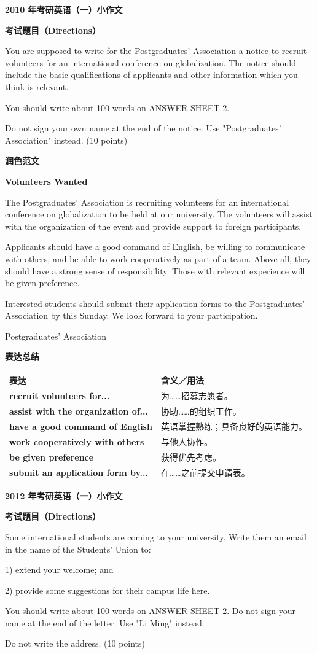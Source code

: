 \documentclass[a4paper,12pt]{article}
\newcommand{\pageheading}[1]{%
  \begin{center}
    {\fontsize{16pt}{20pt}\selectfont\bfseries\color{navy}#1}
  \end{center}
  \vspace{2mm}
}
\newcommand{\sectionlabel}[1]{%
  \vspace{1.5mm}
  {\fontsize{11pt}{14pt}\selectfont\bfseries\color{navy}#1\par}
  \vspace{1mm}
}
\newenvironment{promptbox}{%
  \begin{tcolorbox}[colback=lightgray,colframe=rulegray,boxrule=.35pt,arc=.5mm,
  left=2.2mm,right=2.2mm,top=1.4mm,bottom=1.4mm,before skip=0pt,after skip=1mm]
  \fontsize{11pt}{13.4pt}\selectfont
  \RaggedRight
}{%
  \end{tcolorbox}
}
\newenvironment{essaybody}{%
  \fontsize{14pt}{20pt}\selectfont
  \RaggedRight
  \setlength{\parskip}{5pt}
}{\par}
\newcommand{\expressions}[1]{%
  \sectionlabel{表达总结}
  {\fontsize{10.8pt}{13.2pt}\selectfont
  \begin{tabularx}{\textwidth}{>{\RaggedRight\arraybackslash}p{0.46\textwidth} >{\RaggedRight\arraybackslash}X}
  \toprule
  \textbf{表达} & \textbf{含义／用法}\\
  \midrule
  #1
  \bottomrule
  \end{tabularx}}
}
\newcommand{\exprow}[2]{\textbf{#1} & #2\\}
\newcommand{\noticeissuer}[1]{%
  \par\vspace{2mm}\begin{flushright}\fontsize{14pt}{20pt}\selectfont #1\end{flushright}
}
\begin{document}
\thispagestyle{fancy}
\pageheading{2010 年考研英语（一）小作文}
\sectionlabel{考试题目（Directions）}
\begin{promptbox}
You are supposed to write for the Postgraduates' Association a notice to recruit volunteers for an international conference on globalization. The notice should include the basic qualifications of applicants and other information which you think is relevant.

You should write about 100 words on ANSWER SHEET 2.

Do not sign your own name at the end of the notice. Use "Postgraduates' Association" instead. (10 points)
\end{promptbox}

\sectionlabel{润色范文}
\begin{essaybody}
\begin{center}
\textbf{Volunteers Wanted}
\end{center}
The Postgraduates' Association is recruiting volunteers for an international conference on globalization to be held at our university. The volunteers will assist with the organization of the event and provide support to foreign participants.

Applicants should have a good command of English, be willing to communicate with others, and be able to work cooperatively as part of a team. Above all, they should have a strong sense of responsibility. Those with relevant experience will be given preference.

Interested students should submit their application forms to the Postgraduates' Association by this Sunday. We look forward to your participation.
\noticeissuer{Postgraduates' Association}
\end{essaybody}

\expressions{
\exprow{recruit volunteers for...}{为……招募志愿者。}
\exprow{assist with the organization of...}{协助……的组织工作。}
\exprow{have a good command of English}{英语掌握熟练；具备良好的英语能力。}
\exprow{work cooperatively with others}{与他人协作。}
\exprow{be given preference}{获得优先考虑。}
\exprow{submit an application form by...}{在……之前提交申请表。}
}

\newpage
\thispagestyle{fancy}
\pageheading{2012 年考研英语（一）小作文}
\sectionlabel{考试题目（Directions）}
\begin{promptbox}
Some international students are coming to your university. Write them an email in the name of the Students' Union to:

1) extend your welcome; and

2) provide some suggestions for their campus life here.

You should write about 100 words on ANSWER SHEET 2. Do not sign your name at the end of the letter. Use "Li Ming" instead.

Do not write the address. (10 points)
\end{promptbox}
\end{document}
